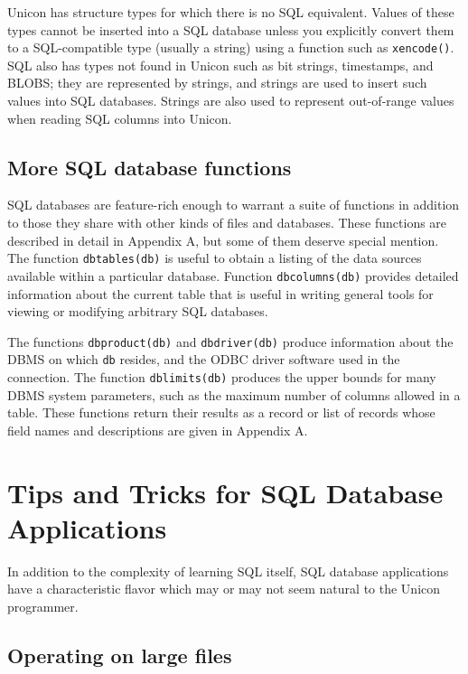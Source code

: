 Unicon has structure types for which there is no SQL equivalent. Values
of these types cannot be inserted into a SQL database unless you
explicitly convert them to a SQL-compatible type (usually a string)
using a function such as \texttt{xencode()}.
SQL also has types not found in Unicon such as bit
strings, timestamps, and BLOBS; they are represented
by strings, and strings are used to insert such values into SQL
databases. Strings are also used to represent out-of-range values when
reading SQL columns into Unicon.

\subsection{More SQL database functions}

SQL databases are feature-rich enough to warrant a suite
of functions in addition to those they
share with other kinds of files and databases. These functions are
described in detail in Appendix A, but some of them deserve special
mention. The function \texttt{dbtables(db)} is useful to obtain a
listing of the data sources available within a particular database.
Function \texttt{dbcolumns(db)} provides detailed information about the
current table that is useful in writing general tools for viewing or
modifying arbitrary SQL databases.

The functions \texttt{dbproduct(db)} and \texttt{dbdriver(db)} produce
information about the DBMS on which \texttt{db} resides, and the
ODBC driver software used in the connection.
The function \texttt{dblimits(db)} produces the upper bounds for many
DBMS system parameters, such as the maximum number of columns allowed
in a table. These functions return their results as
a record or list of records whose field names and descriptions
are given in Appendix A.

\section{Tips and Tricks for SQL Database Applications}

In addition to the complexity of learning SQL itself, SQL database
applications have a characteristic flavor which may or may not seem
natural to the Unicon programmer.

\subsection{Operating on large files}

